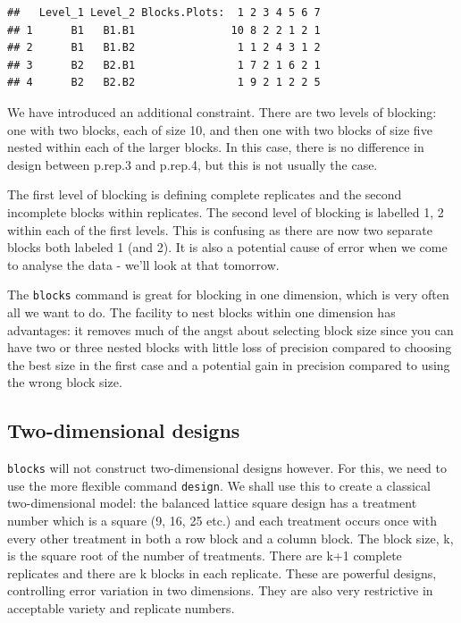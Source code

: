 \documentclass[
]{book}
\begin{document}
\begin{verbatim}
##   Level_1 Level_2 Blocks.Plots:  1 2 3 4 5 6 7
## 1      B1   B1.B1               10 8 2 2 1 2 1
## 2      B1   B1.B2                1 1 2 4 3 1 2
## 3      B2   B2.B1                1 7 2 1 6 2 1
## 4      B2   B2.B2                1 9 2 1 2 2 5
\end{verbatim}

We have introduced an additional constraint. There are two levels of blocking: one with two blocks, each of size 10, and then one with two blocks of size five nested within each of the larger blocks. In this case, there is no difference in design between p.rep.3 and p.rep.4, but this is not usually the case.

The first level of blocking is defining complete replicates and the second incomplete blocks within replicates. The second level of blocking is labelled 1, 2 within each of the first levels. This is confusing as there are now two separate blocks both labeled 1 (and 2). It is also a potential cause of error when we come to analyse the data - we'll look at that tomorrow.

The \texttt{blocks} command is great for blocking in one dimension, which is very often all we want to do. The facility to nest blocks within one dimension has advantages: it removes much of the angst about selecting block size since you can have two or three nested blocks with little loss of precision compared to choosing the best size in the first case and a potential gain in precision compared to using the wrong block size.

\hypertarget{two-dimensional-designs}{%
\subsection{Two-dimensional designs}\label{two-dimensional-designs}}

\texttt{blocks} will not construct two-dimensional designs however. For this, we need to use the more flexible command \texttt{design}. We shall use this to create a classical two-dimensional model: the balanced lattice square design has a treatment number which is a square (9, 16, 25 etc.) and each treatment occurs once with every other treatment in both a row block and a column block. The block size, k, is the square root of the number of treatments. There are k+1 complete replicates and there are k blocks in each replicate. These are powerful designs, controlling error variation in two dimensions. They are also very restrictive in acceptable variety and replicate numbers.
\end{document}
